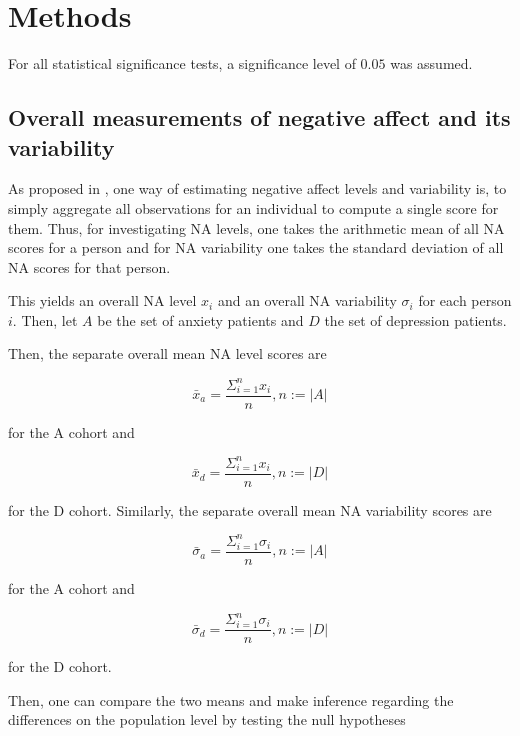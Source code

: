 \section{Methods}
\label{sec:methods}

For all statistical significance tests, a significance level of $0.05$ was assumed.

\subsection{Overall measurements of negative affect and its variability}

As proposed in \citet{rutter2024}, one way of estimating negative affect levels and variability is, to simply aggregate all observations for an individual to compute a single score for them. Thus, for investigating NA levels, one takes the arithmetic mean of all NA scores for a person and for NA variability one takes the standard deviation of all NA scores for that person.

This yields an overall NA level $x_i$ and an overall NA variability $\sigma_i$ for each person $i$. Then, let $A$ be the set of anxiety patients and $D$ the set of depression patients. 

Then, the separate overall mean NA level scores are

\begin{equation}
    \bar{x}_a = \frac{\Sigma_{i = 1}^{n} x_i}{n}, n := |A|
\end{equation}

for the A cohort and 

\begin{equation}
    \bar{x}_d = \frac{\Sigma_{i = 1}^{n} x_i}{n}, n := |D|
\end{equation}

for the D cohort. Similarly, the separate overall mean NA variability scores are

\begin{equation}
    \bar{\sigma}_a = \frac{\Sigma_{i = 1}^{n} \sigma_i}{n}, n := |A|
\end{equation}

for the A cohort and 

\begin{equation}
    \bar{\sigma}_d = \frac{\Sigma_{i = 1}^{n} \sigma_i}{n}, n := |D|
\end{equation}

for the D cohort.

Then, one can compare the two means and make inference regarding the differences on the population level by testing the null hypotheses

